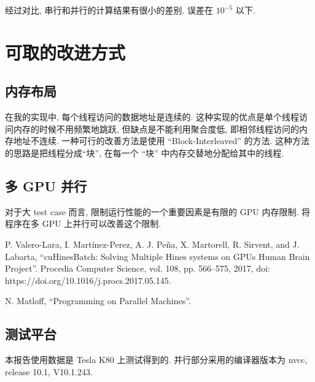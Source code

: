 \documentclass[12pt]{article}
\begin{document}
经过对比, 串行和并行的计算结果有很小的差别. 误差在 $10^{-5}$ 以下.

\section{可取的改进方式}

\subsection{内存布局}

在我的实现中, 每个线程访问的数据地址是连续的. 这种实现的优点是单个线程访问内存的时候不用频繁地跳跃, 但缺点是不能利用聚合度低, 即相邻线程访问的内存地址不连续. 一种可行的改善方法是使用 ``Block-Interleaved'' 的方法.\cite{cuHinesBatch} 这种方法的思路是把线程分成``块'', 在每一个 ``块'' 中内存交替地分配给其中的线程.

\subsection{多 GPU 并行}

对于大 test case 而言, 限制运行性能的一个重要因素是有限的 GPU 内存限制. 将程序在多 GPU 上并行可以改善这个限制.


\begin{thebibliography}{9}  
     P. Valero-Lara, I. Martínez-Perez, A. J. Peña, X. Martorell, R. Sirvent, and J. Labarta, ``cuHinesBatch: Solving Multiple Hines systems on GPUs Human Brain Project''. Procedia Computer Science, vol. 108, pp. 566–575, 2017, doi: https://doi.org/10.1016/j.procs.2017.05.145.

     N. Matloff, ``Programming on Parallel Machines''.

\end{thebibliography}

\begin{appendix}
    \section{测试平台}

    本报告使用数据是 Tesla K80 上测试得到的. 并行部分采用的编译器版本为 nvcc, release 10.1, V10.1.243.
\end{appendix}
\end{document}
